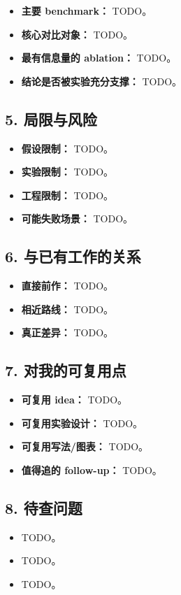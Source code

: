 \begin{itemize}[leftmargin=1.5em]
  \item \textbf{主要 benchmark：} TODO。
  \item \textbf{核心对比对象：} TODO。
  \item \textbf{最有信息量的 ablation：} TODO。
  \item \textbf{结论是否被实验充分支撑：} TODO。
\end{itemize}

\subsection{5. 局限与风险}

\begin{itemize}[leftmargin=1.5em]
  \item \textbf{假设限制：} TODO。
  \item \textbf{实验限制：} TODO。
  \item \textbf{工程限制：} TODO。
  \item \textbf{可能失败场景：} TODO。
\end{itemize}

\subsection{6. 与已有工作的关系}

\begin{itemize}[leftmargin=1.5em]
  \item \textbf{直接前作：} TODO。
  \item \textbf{相近路线：} TODO。
  \item \textbf{真正差异：} TODO。
\end{itemize}

\subsection{7. 对我的可复用点}

\begin{itemize}[leftmargin=1.5em]
  \item \textbf{可复用 idea：} TODO。
  \item \textbf{可复用实验设计：} TODO。
  \item \textbf{可复用写法/图表：} TODO。
  \item \textbf{值得追的 follow-up：} TODO。
\end{itemize}

\subsection{8. 待查问题}

\begin{itemize}[leftmargin=1.5em]
  \item TODO。
  \item TODO。
  \item TODO。
\end{itemize}

